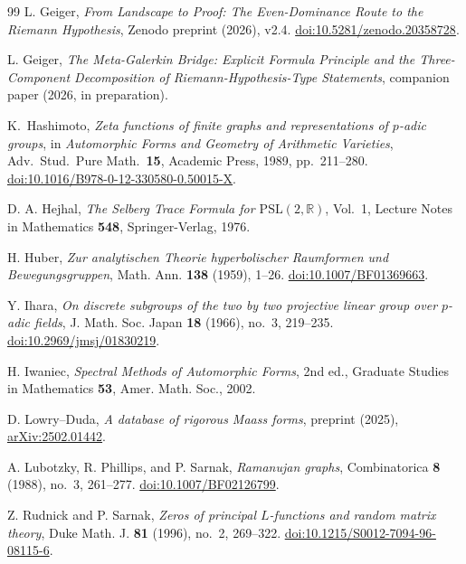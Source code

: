 \documentclass[12pt,a4paper]{article}
\theoremstyle{definition}
\theoremstyle{remark}
\newcommand{\RR}{\mathbb{R}}
\begin{document}
\begin{thebibliography}{99}
L. Geiger,
\emph{From Landscape to Proof: The Even-Dominance Route to the Riemann Hypothesis},
Zenodo preprint (2026), v2.4. \href{https://doi.org/10.5281/zenodo.20358728}{doi:10.5281/zenodo.20358728}.

L. Geiger,
\emph{The Meta-Galerkin Bridge: Explicit Formula Principle and the Three-Component Decomposition of Riemann-Hypothesis-Type Statements},
companion paper (2026, in preparation).

K.\ Hashimoto,
\emph{Zeta functions of finite graphs and representations of $p$-adic groups},
in \emph{Automorphic Forms and Geometry of Arithmetic Varieties},
Adv.\ Stud.\ Pure Math.\ \textbf{15}, Academic Press, 1989, pp.~211--280.
\href{https://doi.org/10.1016/B978-0-12-330580-0.50015-X}{doi:10.1016/B978-0-12-330580-0.50015-X}.

D. A. Hejhal,
\emph{The Selberg Trace Formula for $\mathrm{PSL}(2,\RR)$}, Vol.~1,
Lecture Notes in Mathematics \textbf{548}, Springer-Verlag, 1976.

H. Huber,
\emph{Zur analytischen Theorie hyperbolischer Raumformen und Bewegungsgruppen},
Math. Ann. \textbf{138} (1959), 1--26.
\href{https://doi.org/10.1007/BF01369663}{doi:10.1007/BF01369663}.

Y. Ihara,
\emph{On discrete subgroups of the two by two projective linear group over $p$-adic fields},
J. Math. Soc. Japan \textbf{18} (1966), no.~3, 219--235.
\href{https://doi.org/10.2969/jmsj/01830219}{doi:10.2969/jmsj/01830219}.

H. Iwaniec,
\emph{Spectral Methods of Automorphic Forms},
2nd ed., Graduate Studies in Mathematics \textbf{53}, Amer. Math. Soc., 2002.

D. Lowry--Duda,
\emph{A database of rigorous Maass forms},
preprint (2025), \href{https://arxiv.org/abs/2502.01442}{arXiv:2502.01442}.

A. Lubotzky, R. Phillips, and P. Sarnak,
\emph{Ramanujan graphs},
Combinatorica \textbf{8} (1988), no.~3, 261--277.
\href{https://doi.org/10.1007/BF02126799}{doi:10.1007/BF02126799}.

Z. Rudnick and P. Sarnak,
\emph{Zeros of principal $L$-functions and random matrix theory},
Duke Math. J. \textbf{81} (1996), no.~2, 269--322.
\href{https://doi.org/10.1215/S0012-7094-96-08115-6}{doi:10.1215/S0012-7094-96-08115-6}.


\end{thebibliography}
\end{document}
